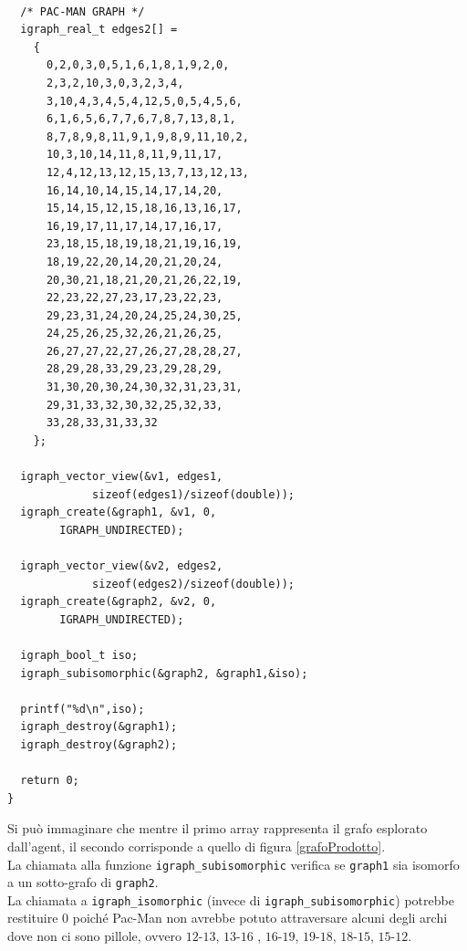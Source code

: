 \documentclass[8pt]{book}
\begin{document}
\begin{spacing}{0.9}
  \begin{small}
\begin{tcolorbox}
\begin{verbatim}
  
  /* PAC-MAN GRAPH */
  igraph_real_t edges2[] =
    {
      0,2,0,3,0,5,1,6,1,8,1,9,2,0,
      2,3,2,10,3,0,3,2,3,4,
      3,10,4,3,4,5,4,12,5,0,5,4,5,6,
      6,1,6,5,6,7,7,6,7,8,7,13,8,1,
      8,7,8,9,8,11,9,1,9,8,9,11,10,2,
      10,3,10,14,11,8,11,9,11,17,
      12,4,12,13,12,15,13,7,13,12,13,
      16,14,10,14,15,14,17,14,20,
      15,14,15,12,15,18,16,13,16,17,
      16,19,17,11,17,14,17,16,17,
      23,18,15,18,19,18,21,19,16,19,
      18,19,22,20,14,20,21,20,24,
      20,30,21,18,21,20,21,26,22,19,
      22,23,22,27,23,17,23,22,23,
      29,23,31,24,20,24,25,24,30,25,
      24,25,26,25,32,26,21,26,25,
      26,27,27,22,27,26,27,28,28,27,
      28,29,28,33,29,23,29,28,29,
      31,30,20,30,24,30,32,31,23,31,
      29,31,33,32,30,32,25,32,33,
      33,28,33,31,33,32
    };
  
  igraph_vector_view(&v1, edges1,
		     sizeof(edges1)/sizeof(double));
  igraph_create(&graph1, &v1, 0,
		IGRAPH_UNDIRECTED);
  
  igraph_vector_view(&v2, edges2,
		     sizeof(edges2)/sizeof(double));
  igraph_create(&graph2, &v2, 0,
		IGRAPH_UNDIRECTED);
  
  igraph_bool_t iso;
  igraph_subisomorphic(&graph2, &graph1,&iso);
  
  printf("%d\n",iso);
  igraph_destroy(&graph1);
  igraph_destroy(&graph2);
  
  return 0;
}
\end{verbatim}
    \end{tcolorbox}
  \end{small}
\end{spacing}

Si può immaginare che mentre il primo array rappresenta il grafo esplorato dall'agent, il secondo corrisponde a quello di figura \ref{grafoProdotto}.\\
La chiamata alla funzione \texttt{igraph\_subisomorphic} verifica se \texttt{graph1} sia isomorfo a un sotto-grafo di \texttt{graph2}.\\
La chiamata a \texttt{igraph\_isomorphic} (invece di \texttt{igraph\_subisomorphic}) potrebbe restituire $0$ poiché Pac-Man non avrebbe potuto attraversare alcuni degli archi dove non ci sono pillole, ovvero $12$-$13$, $13$-$16$ , $16$-$19$, $19$-$18$, $18$-$15$, $15$-$12$.
\end{document}
